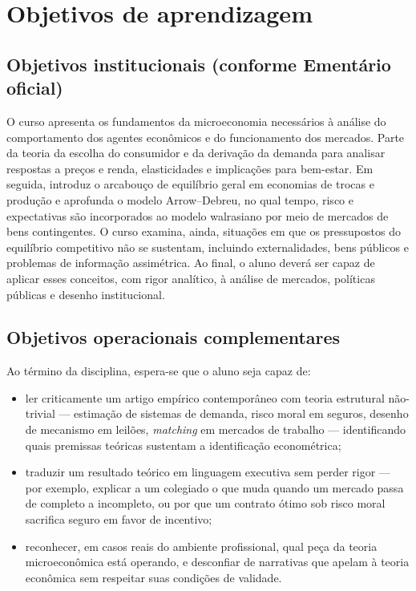\documentclass[11pt,a4paper]{article}
\begin{document}
\section{Objetivos de aprendizagem}

\subsection*{Objetivos institucionais (conforme Ementário oficial)}

O curso apresenta os fundamentos da microeconomia necessários à análise do comportamento dos agentes econômicos e do funcionamento dos mercados. Parte da teoria da escolha do consumidor e da derivação da demanda para analisar respostas a preços e renda, elasticidades e implicações para bem-estar. Em seguida, introduz o arcabouço de equilíbrio geral em economias de trocas e produção e aprofunda o modelo Arrow--Debreu, no qual tempo, risco e expectativas são incorporados ao modelo walrasiano por meio de mercados de bens contingentes. O curso examina, ainda, situações em que os pressupostos do equilíbrio competitivo não se sustentam, incluindo externalidades, bens públicos e problemas de informação assimétrica. Ao final, o aluno deverá ser capaz de aplicar esses conceitos, com rigor analítico, à análise de mercados, políticas públicas e desenho institucional.

\subsection*{Objetivos operacionais complementares}

Ao término da disciplina, espera-se que o aluno seja capaz de:

\begin{itemize}
  \item ler criticamente um artigo empírico contemporâneo com teoria estrutural não-trivial --- estimação de sistemas de demanda, risco moral em seguros, desenho de mecanismo em leilões, \textit{matching} em mercados de trabalho --- identificando quais premissas teóricas sustentam a identificação econométrica;
  \item traduzir um resultado teórico em linguagem executiva sem perder rigor --- por exemplo, explicar a um colegiado o que muda quando um mercado passa de completo a incompleto, ou por que um contrato ótimo sob risco moral sacrifica seguro em favor de incentivo;
  \item reconhecer, em casos reais do ambiente profissional, qual peça da teoria microeconômica está operando, e desconfiar de narrativas que apelam à teoria econômica sem respeitar suas condições de validade.
\end{itemize}
\end{document}
